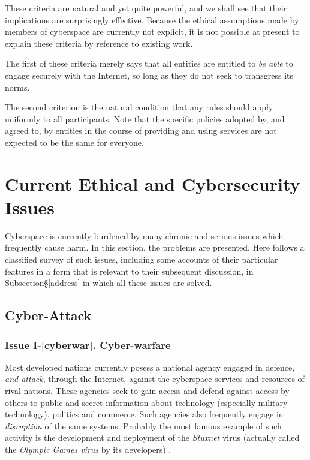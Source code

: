 These criteria are natural and yet quite powerful, and we shall see that their implications are surprisingly effective. Because the ethical assumptions made by members of cyberspace are currently not explicit, it is not possible at present to explain these criteria by reference to existing work.

The first of these criteria merely says that all entities are entitled to {\em be able} to engage securely with the Internet, so long as they do not seek to transgress its norms.

The second criterion is the natural condition that any rules should apply uniformly to all participants. Note that the specific policies adopted by, and agreed to, by entities in the course of providing and using services are not expected to be the same for everyone.

\section{Current Ethical and Cybersecurity Issues}\label{issues}

Cyberspace is currently burdened by many chronic and serious issues which frequently cause harm. In this section, the problems are presented. Here follows a classified survey of such issues, including some accounts of their particular features in a form that is relevant to their subsequent discussion, in Subsection\S \ref{address} in which all these issues are solved.

\subsection{Cyber-Attack}\label{cybattk}

\subsubsection*{Issue I-\ref{cyberwar}. {Cyber-warfare}}\label{cyberwarsol}
%
Most developed nations currently posess a national agency
engaged in defence, {\em and attack}, through the Internet,
against the cyberspace services and resources of rival nations.
These agencies seek to gain access and defend against
access by others to public and secret information
about technology (especially military technology),
politics and commerce. 
Such agencies also frequently engage in {\em disruption} of the same systems. Probably
the most famous example of such activity is the development
and deployment of the {\em Stuxnet} virus (actually called the 
{\em Olympic Games virus} by its developers)  \cite{kushner2013real,langner2011stuxnet} .


